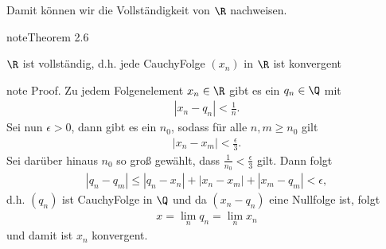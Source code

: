 \documentclass[letterpaper,10pt,english]{jupyterBook}
\begin{document}
Damit können wir die Vollständigkeit von \(\R\) nachweisen.
\label{grundlagen/zahlensysteme:theorem-24}
\begin{sphinxadmonition}{note}{Theorem 2.6}



\(\R\) ist vollständig, d.h. jede Cauchy\sphinxhyphen{}Folge \((x_n)\) in \(\R\) ist konvergent
\end{sphinxadmonition}

\begin{sphinxadmonition}{note}
Proof.  Zu jedem Folgenelement \(x_n \in \R\) gibt es ein \(q_n \in \Q\) mit
\begin{equation*}
\begin{split}|x_n-q_n| < \frac{1}n.\end{split}
\end{equation*}
Sei nun \(\epsilon > 0\), dann gibt es ein \(n_0\), sodass für alle \(n,m \geq n_0\) gilt
\begin{equation*}
\begin{split}|x_n - x_m| < \frac{\epsilon}3.\end{split}
\end{equation*}
Sei darüber hinaus \(n_0\) so groß gewählt, dass \(\frac{1}{n_0} < \frac{\epsilon}3\) gilt. Dann folgt
\begin{equation*}
\begin{split}|q_n - q_m| \leq |q_n - x_n| + |x_n - x_m| + |x_m-q_m| <\epsilon,\end{split}
\end{equation*}
d.h. \((q_n)\) ist Cauchy\sphinxhyphen{}Folge in \(\Q\) und da \((x_n -q_n)\) eine Nullfolge ist, folgt
\begin{equation*}
\begin{split} x=\lim_n q_n = \lim_n x_n\end{split}
\end{equation*}
und damit ist \(x_n\) konvergent.
\end{sphinxadmonition}
\end{document}
